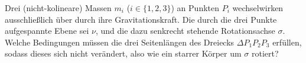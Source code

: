 \begin{minipage}[b]{0.6\textwidth}

\begin{Exercise}[label  = rotierendes 3-Körper-Problem, difficulty = 3, label = cmrot, origin = {XX. IPhO 1989}, title = Starrer Körper]
	Drei (nicht-kolineare) Massen $m_i$ ($i \in \{1,2,3\}$) an Punkten $P_i$ wechselwirken ausschließlich über durch ihre Gravitationskraft. Die durch die drei Punkte aufgespannte Ebene sei $\nu$, und die dazu senkrecht stehende Rotationsachse $\sigma$. Welche Bedingungen müssen die drei Seitenlängen des Dreiecks $\Delta P_1P_2P_3$ erfüllen, sodass dieses sich nicht verändert, also wie ein starrer Körper um $\sigma$ rotiert?
\end{Exercise}
\end{minipage}
\begin{minipage}[b]{0.4\textwidth}
	\centering
{}
\end{minipage}